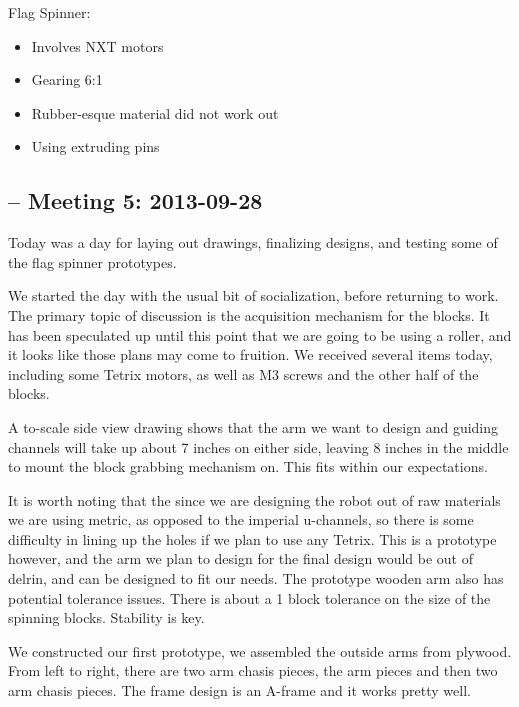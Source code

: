 \documentclass{article}
\begin{document}
Flag Spinner:
\begin{itemize}
\item Involves NXT motors
\item Gearing 6:1
\item Rubber-esque material did not work out
\item Using extruding pins
\end{itemize}

\newpage \subsection{-- Meeting 5: 2013-09-28}
Today was a day for laying out drawings, finalizing designs, and testing some of the flag spinner prototypes. 

We started the day with the usual bit of socialization, before returning to work. The primary topic of discussion is the acquisition mechanism for the blocks. It has been speculated up until this point that we are going to be using a roller, and it looks like those plans may come to fruition. 
We received several items today, including some Tetrix motors, as well as M3 screws and the other half of the blocks.

A to-scale side view drawing shows that the arm we want to design and guiding channels will take up about 7 inches on either side, leaving 8 inches in the middle to mount the block grabbing mechanism on. This fits within our expectations.

It is worth noting that the since we are designing the robot out of raw materials we are using metric, as opposed to the imperial u-channels, so there is some difficulty in lining up the holes if we plan to use any Tetrix. This is a prototype however, and the arm we plan to design for the final design would be out of delrin, and can be designed to fit our needs. The prototype wooden arm also has potential tolerance issues. There is about a 1 block tolerance on the size of the spinning blocks. Stability is key. 

We constructed our first prototype, we assembled the outside arms from plywood. From left to right, there are two arm chasis pieces, the arm pieces and then two arm chasis pieces. The frame design is an A-frame and it works pretty well.
\end{document}
